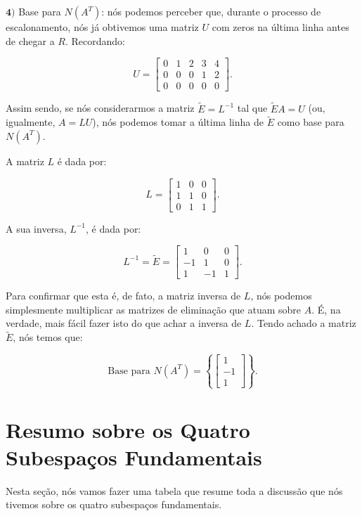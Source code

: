 \begin{Example}
	$\mathbf{4)}$ Base para $N(A^T)$: nós podemos perceber que, durante o processo de escalonamento, nós já obtivemos uma matriz $U$ com zeros na última linha antes de chegar a $R$. Recordando:
	
	$$
	U = \begin{bmatrix}
		0 & 1 & 2 & 3 & 4 \\
		0 & 0 & 0 & 1 & 2 \\
		0 & 0 & 0 & 0 & 0
	\end{bmatrix}.
	$$
	
	Assim sendo, se nós considerarmos a matriz $\tilde{E} = L^{-1}$ tal que $\tilde{E}A = U$ (ou, igualmente, $A = LU$), nós podemos tomar a última linha de $\tilde{E}$ como base para $N(A^T)$.
	
	A matriz $L$ é dada por:
	
	$$
	L = \begin{bmatrix}
		1 & 0 & 0 \\
		1 & 1 & 0 \\
		0 & 1 & 1
	\end{bmatrix}.
	$$
	
	A sua inversa, $L^{-1}$, é dada por:
	
	$$
	L^{-1} = \tilde{E} = \begin{bmatrix}
		1 & 0 & 0 \\
		-1 & 1 & 0 \\
		1 & -1 & 1
	\end{bmatrix}.
	$$
	
	Para confirmar que esta é, de fato, a matriz inversa de $L$, nós podemos simplesmente multiplicar as matrizes de eliminação que atuam sobre $A$. É, na verdade, mais fácil fazer isto do que achar a inversa de $L$. Tendo achado a matriz $\tilde{E}$, nós temos que:
	
	$$
	\text{Base para $N(A^T)$} = \left\{\begin{bmatrix}
		1 \\
		-1 \\
		1
	\end{bmatrix}\right\}.
	$$
\end{Example}

\section{Resumo sobre os Quatro Subespaços Fundamentais}

Nesta seção, nós vamos fazer uma tabela que resume toda a discussão que nós tivemos sobre os quatro subespaços fundamentais.

